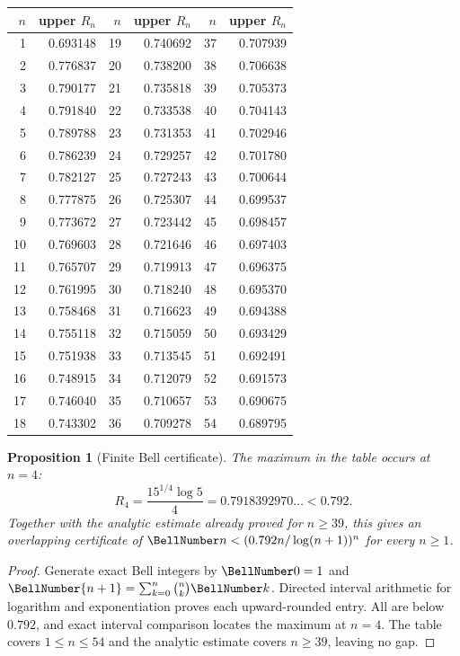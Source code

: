 \documentclass[11pt,a4paper,oneside,openany]{book}
\newtheorem{proposition}[theorem]{Proposition}
\theoremstyle{definition}
\theoremstyle{remark}
\begin{document}
\begin{center}
\small
\begin{tabular}{rr@{\qquad}rr@{\qquad}rr}
\toprule
$n$&upper $R_n$&$n$&upper $R_n$&$n$&upper $R_n$\\
\midrule
1&0.693148&19&0.740692&37&0.707939\\
2&0.776837&20&0.738200&38&0.706638\\
3&0.790177&21&0.735818&39&0.705373\\
4&0.791840&22&0.733538&40&0.704143\\
5&0.789788&23&0.731353&41&0.702946\\
6&0.786239&24&0.729257&42&0.701780\\
7&0.782127&25&0.727243&43&0.700644\\
8&0.777875&26&0.725307&44&0.699537\\
9&0.773672&27&0.723442&45&0.698457\\
10&0.769603&28&0.721646&46&0.697403\\
11&0.765707&29&0.719913&47&0.696375\\
12&0.761995&30&0.718240&48&0.695370\\
13&0.758468&31&0.716623&49&0.694388\\
14&0.755118&32&0.715059&50&0.693429\\
15&0.751938&33&0.713545&51&0.692491\\
16&0.748915&34&0.712079&52&0.691573\\
17&0.746040&35&0.710657&53&0.690675\\
18&0.743302&36&0.709278&54&0.689795\\
\bottomrule
\end{tabular}
\end{center}

\begin{proposition}[Finite Bell certificate]
The maximum in the table occurs at $n=4$:
\begin{equation}
 R_4=\frac{15^{1/4}\log5}{4}=0.7918392970\ldots<0.792.              \label{eq:merged-bell-ratio-max}
\end{equation}
Together with the analytic estimate already proved for $n\geq39$, this gives
an overlapping certificate of
$\BellNumber n<(0.792n/\log(n+1))^n$ for every $n\geq1$.
\end{proposition}

\begin{proof}
Generate exact Bell integers by
$\BellNumber0=1$ and
$\BellNumber{n+1}=\sum_{k=0}^{n}\binom nk\BellNumber k$.  Directed interval arithmetic
for logarithm and exponentiation proves each upward-rounded entry.  All are
below $0.792$, and exact interval comparison locates the maximum at $n=4$.
The table covers $1\leq n\leq54$ and the analytic estimate covers
$n\geq39$, leaving no gap.
\end{proof}
\end{document}
